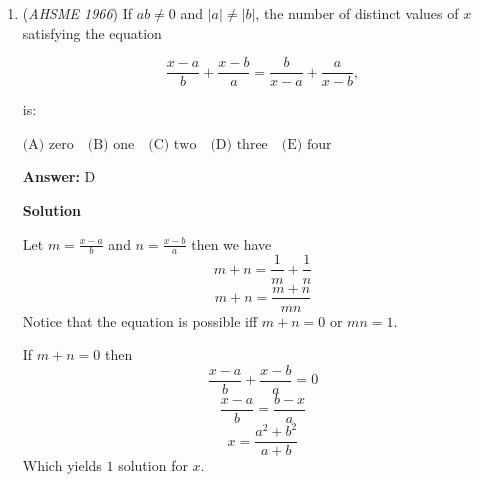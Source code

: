 \begin{enumerate}
 \textbf{Answer: }B



\textbf{Solution}

Both triangles are similar by some ratio $r$. Place point $P$ on $A$. Then. line $MD$ intersects $BC$ at midpoint $D$, and the ratio of the two triangles is $\frac{1}{2}$. Place point $P$ on $M$, and then the same thing occurs, line $MD$ intersects $BC$ at midpoint $D$, and the ratio is $\frac{1}{2}$. Now as $P$ moves between $AM$, $D$ follows it to maintain parallelism. However, the only exception is when $P$ reaches past the midpoint of $AM$, and going towards $A$, when $D$ moves back toward the midpoint of $BC$ to maintain parallelism. Because both triangles are always similar at the extrema points, that are, $A$ and $M$, as $P$ moves around, the value of $r$ won't change as it is essentially the same as the cevian $MD$ of triangle $BPD$ moving along the base $BP$. So essentially, that the effect of $P$ moving along line $AM$ is essentially just moving the cevian $MD$, as it changes as $P$ moves, along the base. However, because the two triangles are similar, moving the cevian $MD$ is the same as moving the cevian $CP$, and they maintain the same ratio. At the extrema's, these values of $r$ were $\frac{1}{2}$. so as $P$ moves, the value of $r$ becomes unchanged and independent of that from the position of $P$. Thus our answer is $\boxed{\textbf{B}}$.

 


	\item (\textit{AHSME 1966}) If $ab \ne 0$ and $|a| \ne |b|$, the number of distinct values of $x$ satisfying the equation


 
 \[\frac{x-a}{b}+\frac{x-b}{a}=\frac{b}{x-a}+\frac{a}{x-b},\]


 is:


 $\text{(A) zero}  \quad \text{(B) one}  \quad \text{(C) two}  \quad \text{(D) three}  \quad \text{(E) four}$

 \textbf{Answer: }D



\textbf{Solution}

Let $m=\frac{x-a}{b}$ and $n=\frac{x-b}{a}$ then we have
 \[m+n=\frac{1}{m}+\frac{1}{n}\]
 \[m+n=\frac{m+n}{mn}\]Notice that the equation is possible iff $m+n=0$ or $mn=1$.

 If $m+n=0$ then
 \[\frac{x-a}{b}+\frac{x-b}{a}=0\]
 \[\frac{x-a}{b}=\frac{b-x}{a}\]
 \[x=\frac{a^2+b^2}{a+b}\]Which yields $1$ solution for $x$.


\end{enumerate}
